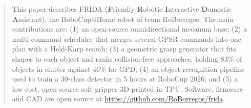 \begin{abstract}
This paper describes FRIDA (\textbf{F}riendly \textbf{R}obotic \textbf{I}nteractive \textbf{D}omestic \textbf{A}ssistant), the RoboCup@Home robot of team RoBorregos. The main contributions are: (1) an open-source omnidirectional mecanum base; (2) a multi-command scheduler that merges several GPSR commands into one plan with a Held-Karp search; (3) a geometric grasp generator that fits shapes to each object and ranks collision-free approaches, holding 83\% of objects in clutter against 46\% for GPD; (4) an object-recognition pipeline used to train a 30-class detector in 5 hours at RoboCup 2026; and (5) a low-cost, open-source soft gripper 3D-printed in TPU. Software, firmware and CAD are open source at \url{https://github.com/RoBorregos/frida}.
\end{abstract}